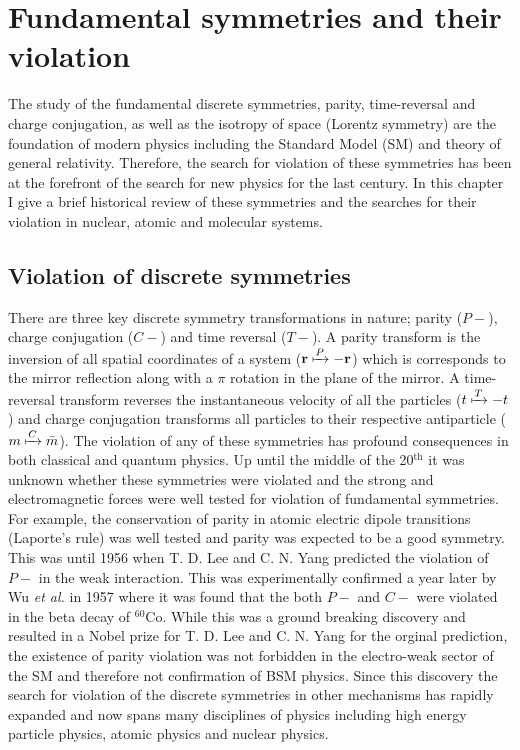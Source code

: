\documentclass[10pt,a4paper, twoside]{report}
\begin{document}
\chapter{Fundamental symmetries and their violation} \label{chap:Violation}
The study of the fundamental discrete symmetries, parity, time-reversal and charge conjugation, as well as the isotropy of space (Lorentz symmetry) are the foundation of modern physics including the Standard Model (SM) and theory of general relativity. Therefore, the search for violation of these symmetries has been at the forefront of the search for new physics for the last century. In this chapter I give a brief historical review of these symmetries and the searches for their violation in nuclear, atomic and molecular systems. 

\section{Violation of discrete symmetries}
There are three key discrete symmetry transformations in nature; parity ($P-$), charge conjugation ($C-$) and time reversal ($T-$). A parity transform is the inversion of all spatial coordinates of a system ($\textbf{r} \xmapsto{P} -\textbf{r}$) which is corresponds to the mirror reflection along with a $\pi$ rotation in the plane of the mirror. A time-reversal transform reverses the instantaneous velocity of all the particles ($t \xmapsto{T} -t$) and charge conjugation transforms all particles to their respective antiparticle ($m \xmapsto{C} \bar{m}$). The violation of any of these symmetries has profound consequences in both classical and quantum physics. Up until the middle of the 20$^{\text{th}}$ it was unknown whether these symmetries were violated and the strong and electromagnetic forces were well tested for violation of fundamental symmetries.  For example, the conservation of parity in atomic electric dipole transitions (Laporte's rule) was well tested and parity was expected to be a good symmetry. This was until 1956 when T. D. Lee and C. N. Yang predicted the violation of $P-$ in the weak interaction\cite{Yang1956}.  This was experimentally confirmed a year later  by Wu \textit{et al.} in 1957 \cite{Wu1957} where it was found that the both $P-$ and $C-$ were violated in the beta decay of $^{60}$Co. While this was a ground breaking discovery and resulted in a Nobel prize for  T. D. Lee and C. N. Yang for the orginal prediction, the existence of parity violation was not forbidden in the electro-weak sector of the SM and therefore not confirmation of BSM physics.   Since this discovery the search for violation of the discrete symmetries in other mechanisms has rapidly expanded and now spans many disciplines of physics including high energy particle physics, atomic physics and nuclear physics. \\
\end{document}
